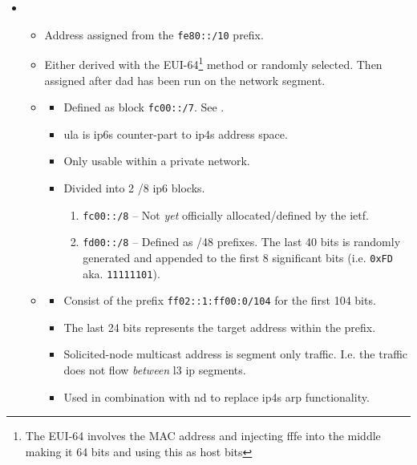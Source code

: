 \begin{itemize}
    \item {}
    \begin{itemize}
        \item Address assigned from the \texttt{fe80::/10} prefix.
        \item Either derived with the EUI-64\footnote{The EUI-64 involves the MAC address and injecting fffe into the middle making it 64 bits and using this as host bits} method or randomly selected. Then assigned after \gls{dad} has been run on the network segment.
        \item {}\cite{wiki:Unique_local_address}
        \begin{itemize}
            \item Defined as block \texttt{fc00::/7}. See .
            \item \gls{ula} is \glspl{ip6} counter-part to \glspl{ip4}  address space.
            \item Only usable within a private network.
            \item Divided into 2 /8 \gls{ip6} blocks.
            \begin{enumerate}
                \item \texttt{fc00::/8} -- Not \textit{yet} officially allocated/defined by the \gls{ietf}.
                \item \texttt{fd00::/8} -- Defined as /48 prefixes. The last 40 bits is randomly generated and appended to the first 8 significant bits {\small (i.e. \texttt{0xFD} aka. \texttt{11111101})}.
            \end{enumerate}
        \end{itemize}
        \item {}\cite{wiki:Solicited-node_multicast_address}
        \begin{itemize}
            \item Consist of the prefix \texttt{ff02::1:ff00:0/104} for the first 104 bits.
            \item The last 24 bits represents the target address within the prefix.
            \item Solicited-node multicast address is segment only traffic. I.e. the traffic does not flow \textit{between} \gls{l3} \gls{ip} segments.
            \item Used in combination with \gls{nd} to replace \glspl{ip4} \gls{arp} functionality.

\end{itemize}
\end{itemize}
\end{itemize}
